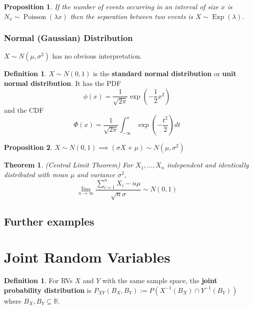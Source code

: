 \documentclass[12pt]{article}
\newtheorem{thm}{Theorem}[section]
\newtheorem*{prop*}{Proposition}
\theoremstyle{definition}
\newtheorem{defn}{Definition}[subsection]
\newtheorem*{defn*}{Definition}
\newcommand{\R}{\mathbb{R}}
\DeclareMathOperator{\Poisson}{Poisson}
\DeclareMathOperator{\Exp}{Exp}
\begin{document}
\begin{prop*}
  If the number of events occurring in an interval of size $x$ is\\ $N_x \sim \Poisson(\lambda x)$ then the separation between two events is $X \sim \Exp(\lambda)$.
\end{prop*}

\subsubsection{Normal (Gaussian) Distribution}

$X \sim N(\mu, \sigma^2)$ has no obvious interpretation.

\begin{defn*}
  $X \sim N(0, 1)$ is the \textbf{standard normal distribution} or \textbf{unit normal distribution}.
  It has the PDF
  $$\phi(x) = \frac{1}{\sqrt{2\pi}}\exp\left(-\frac{1}{2}x^2\right)$$
  and the CDF
  $$\Phi(x) = \frac{1}{\sqrt{2\pi}}\int_{-\infty}^x\exp\left(-\frac{t^2}{2}\right)dt$$
\end{defn*}

\begin{prop*}
  $X \sim N(0, 1) \implies (\sigma X + \mu) \sim N(\mu, \sigma^2)$
\end{prop*}


\begin{thm}
  (Central Limit Theorem)
  For $X_1, \ldots, X_n$ independent and identically distributed with mean $\mu$ and variance $\sigma^2$,
  $$\lim_{n \to \infty}\frac{\sum_{i = 1}^nX_i - n\mu}{\sqrt{n}\sigma} \sim N(0, 1)$$
\end{thm}


\subsection{Further examples}

\section{Joint Random Variables}

\begin{defn}
  For RVs $X$ and $Y$ with the same sample space, the \textbf{joint probability distribution} is $P_{XY}(B_X, B_Y) := P(X^{-1}(B_X) \cap Y^{-1}(B_Y))$ where $B_X, B_Y \subseteq \R$.
\end{defn}
\end{document}
